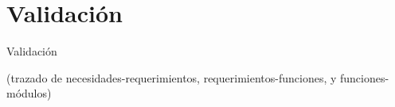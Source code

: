 \section{Validaci\'on}
\label{Validacion}

Validaci\'on
\par
(trazado de necesidades-requerimientos, requerimientos-funciones, y funciones-módulos)
